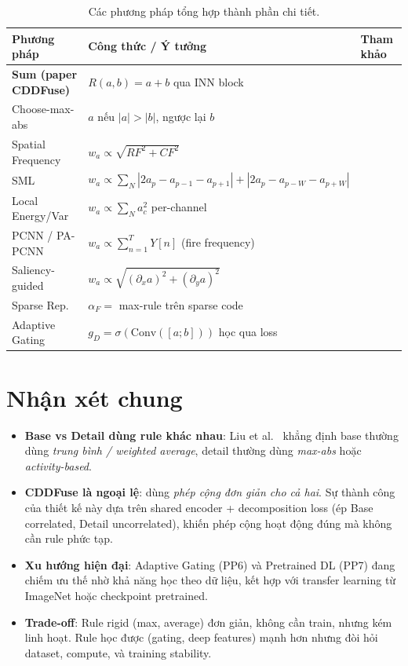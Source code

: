 \documentclass[12pt,a4paper]{article}
\begin{document}
\begin{table}[h]
\centering
\small
\caption{Các phương pháp tổng hợp thành phần chi tiết.}
\label{tab:detail-methods}
\begin{tabular}{l p{7.5cm} l}
\toprule
\textbf{Phương pháp} & \textbf{Công thức / Ý tưởng} & \textbf{Tham khảo} \\
\midrule
\textbf{Sum (paper CDDFuse)} & $R(a,b) = a + b$ qua INN block & \cite{zhao2023cddfuse} \\
Choose-max-abs & $a$ nếu $|a|>|b|$, ngược lại $b$ & \cite{li1995wavelet} \\
Spatial Frequency & $w_a \propto \sqrt{RF^2 + CF^2}$ & \cite{eskicioglu1995sf} \\
SML & $w_a \propto \sum_N |2a_p - a_{p-1} - a_{p+1}| + |2a_p - a_{p-W} - a_{p+W}|$ & \cite{huang2007sml} \\
Local Energy/Var & $w_a \propto \sum_N a_c^2$ per-channel & \cite{liu2017survey} \\
PCNN / PA-PCNN & $w_a \propto \sum_{n=1}^T Y[n]$ (fire frequency) & \cite{eckhorn1990pcnn,yin2019papcnn} \\
Saliency-guided & $w_a \propto \sqrt{(\partial_x a)^2 + (\partial_y a)^2}$ & \cite{liu2016saliency} \\
Sparse Rep. & $\alpha_F = $ max-rule trên sparse code & \cite{yang2010spfusion} \\
Adaptive Gating & $g_D = \sigma(\mathrm{Conv}([a;b]))$ học qua loss & \cite{prabhakar2017deepfuse} \\
\bottomrule
\end{tabular}
\end{table}

\section{Nhận xét chung}

\begin{itemize}\itemsep0pt
    \item \textbf{Base vs Detail dùng rule khác nhau}: Liu et al.\ \cite{liu2017survey} khẳng định base thường dùng \emph{trung bình / weighted average}, detail thường dùng \emph{max-abs} hoặc \emph{activity-based}.
    \item \textbf{CDDFuse \cite{zhao2023cddfuse} là ngoại lệ}: dùng \emph{phép cộng đơn giản cho cả hai}. Sự thành công của thiết kế này dựa trên shared encoder + decomposition loss (ép Base correlated, Detail uncorrelated), khiến phép cộng hoạt động đúng mà không cần rule phức tạp.
    \item \textbf{Xu hướng hiện đại}: Adaptive Gating (PP6) và Pretrained DL (PP7) đang chiếm ưu thế nhờ khả năng học theo dữ liệu, kết hợp với transfer learning từ ImageNet hoặc checkpoint pretrained.
    \item \textbf{Trade-off}: Rule rigid (max, average) đơn giản, không cần train, nhưng kém linh hoạt. Rule học được (gating, deep features) mạnh hơn nhưng đòi hỏi dataset, compute, và training stability.
\end{itemize}
\end{document}
